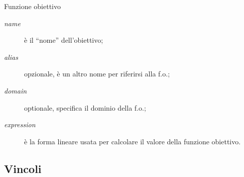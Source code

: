\documentclass{beamer}
\begin{document}
\begin{frame}%
{Funzione obiettivo}
\noindent
{}

\begin{description}
\item[{\it name}] \`e il ``nome'' dell'obiettivo;

\item[{\it alias}] opzionale, \`e un altro nome per riferirsi alla f.o.;

\item[{\it domain}] optionale, specifica il dominio della f.o.;

\item[{\it expression}] \`e la forma lineare usata per calcolare il
valore della funzione obiettivo.
\end{description}
\end{frame}

\subsection{Vincoli}
\end{document}
